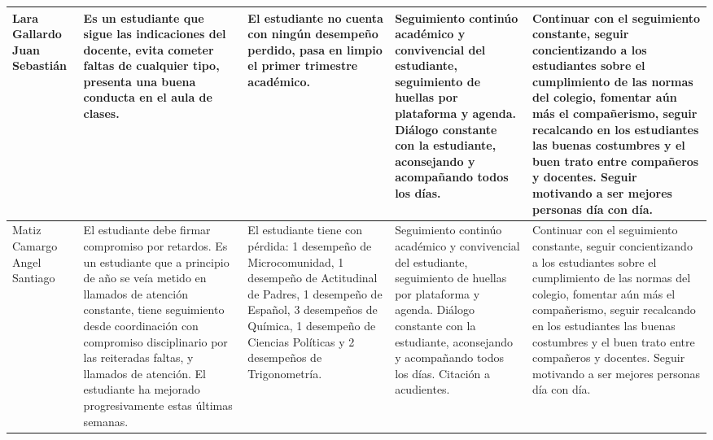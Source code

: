 \documentclass[spanish,11pt,a4paper]{article}
\begin{document}
\begin{longtable}{|p{3.5cm}|p{3.5cm}|p{3.5cm}|p{3.5cm}|p{3.5cm}|}
		Lara Gallardo Juan Sebastián & 
		Es un estudiante que sigue las indicaciones del docente, evita cometer faltas de cualquier tipo, presenta una buena conducta en el aula de clases. & 
		El estudiante no cuenta con ningún desempeño perdido, pasa en limpio el primer trimestre académico. & 
		Seguimiento continúo académico y convivencial del estudiante, seguimiento de huellas por plataforma y agenda. Diálogo constante con la estudiante, aconsejando y acompañando todos los días. & 
		Continuar con el seguimiento constante, seguir concientizando a los estudiantes sobre el cumplimiento de las normas del colegio, fomentar aún más el compañerismo, seguir recalcando en los estudiantes las buenas costumbres y el buen trato entre compañeros y docentes. Seguir motivando a ser mejores personas día con día.\\
		\hline
		
		Matiz Camargo Angel Santiago & 
		El estudiante debe firmar compromiso por retardos.
		Es un estudiante que a principio de año se veía metido en llamados de atención constante, tiene seguimiento desde coordinación con compromiso disciplinario por las reiteradas faltas, y llamados de atención. El estudiante ha mejorado progresivamente estas últimas semanas.  
		& 
		El estudiante tiene con pérdida: 1 desempeño de Microcomunidad, 1 desempeño de Actitudinal de Padres, 1 desempeño de Español, 3 desempeños de Química, 1 desempeño de Ciencias Políticas y 2 desempeños de Trigonometría. & 
		Seguimiento continúo académico y convivencial del estudiante, seguimiento de huellas por plataforma y agenda. Diálogo constante con la estudiante, aconsejando y acompañando todos los días. Citación a acudientes.& 
		Continuar con el seguimiento constante, seguir concientizando a los estudiantes sobre el cumplimiento de las normas del colegio, fomentar aún más el compañerismo, seguir recalcando en los estudiantes las buenas costumbres y el buen trato entre compañeros y docentes. Seguir motivando a ser mejores personas día con día.\\
		\hline
		

\end{longtable}
\end{document}

